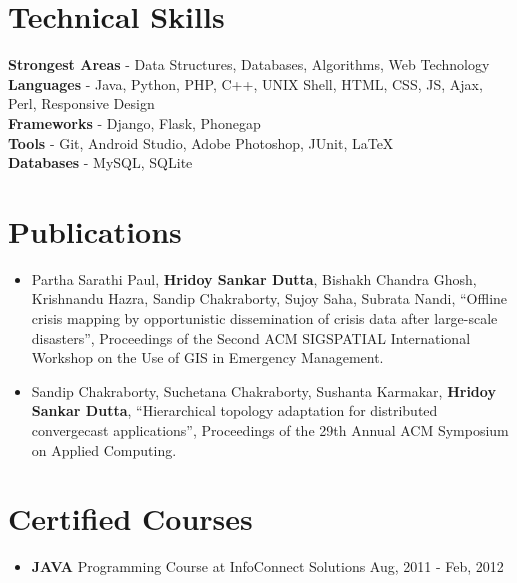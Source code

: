 \documentclass[margin, centered]{res}
\begin{document}
\begin{resume}

\section{Technical \hspace{2mm} Skills}
\textbf{Strongest Areas} - Data Structures, Databases, Algorithms, Web Technology \\
\textbf{Languages} - Java, Python,  PHP, C++, UNIX Shell, HTML, CSS, JS, Ajax, Perl, Responsive Design \\
\textbf{Frameworks} - Django, Flask, Phonegap \\
\textbf{Tools} - Git, Android Studio, Adobe Photoshop, JUnit, \LaTeX \\
\textbf{Databases} - MySQL, SQLite \\


\section{Publications}
\begin{itemize}[leftmargin=*]
\item Partha Sarathi Paul, \textbf{Hridoy Sankar Dutta}, Bishakh Chandra Ghosh, Krishnandu Hazra, Sandip Chakraborty, Sujoy Saha, Subrata Nandi, ``Offline crisis mapping by opportunistic dissemination of crisis data after large-scale disasters'', Proceedings of the Second ACM SIGSPATIAL International Workshop on the Use of GIS in Emergency Management.
\item Sandip Chakraborty, Suchetana Chakraborty, Sushanta Karmakar, \textbf{Hridoy Sankar Dutta}, ``Hierarchical topology adaptation for distributed convergecast applications'', Proceedings of the 29th Annual ACM Symposium on Applied Computing.
\end{itemize}

\section{Certified \hspace{2mm} Courses}
\begin{itemize}[leftmargin=*]
\item \textbf{JAVA} Programming Course at InfoConnect Solutions \hfill Aug, 2011 - Feb, 2012 \\
\end{itemize}

\end{resume}
\end{document}
